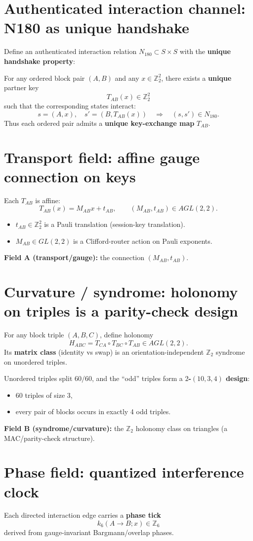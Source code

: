 \documentclass[11pt]{article}
\begin{document}
\section{Authenticated interaction channel: N180 as unique handshake}
Define an authenticated interaction relation $N_{180}\subset S\times S$ with the \textbf{unique handshake property}:

For any ordered block pair $(A,B)$ and any $x\in\mathbb{Z}_2^2$, there exists a \textbf{unique} partner key
\[
T_{AB}(x)\in\mathbb{Z}_2^2
\]
such that the corresponding states interact:
\[
s=(A,x),\quad s'=(B,T_{AB}(x))\quad\Rightarrow\quad (s,s')\in N_{180}.
\]
Thus each ordered pair admits a \textbf{unique key-exchange map} $T_{AB}$.

\section{Transport field: affine gauge connection on keys}
Each $T_{AB}$ is affine:
\[
T_{AB}(x)=M_{AB}x+t_{AB},\qquad (M_{AB},t_{AB})\in AGL(2,2).
\]
\begin{itemize}
  \item $t_{AB}\in\mathbb{Z}_2^2$ is a Pauli translation (session-key translation).
  \item $M_{AB}\in GL(2,2)$ is a Clifford-router action on Pauli exponents.
\end{itemize}
\noindent\textbf{Field A (transport/gauge):} the connection $(M_{AB},t_{AB})$.

\section{Curvature / syndrome: holonomy on triples is a parity-check design}
For any block triple $(A,B,C)$, define holonomy
\[
H_{ABC}=T_{CA}\circ T_{BC}\circ T_{AB}\in AGL(2,2).
\]
Its \textbf{matrix class} (identity vs swap) is an orientation-independent $\mathbb{Z}_2$ syndrome on unordered triples.

Unordered triples split $60/60$, and the “odd” triples form a \textbf{$2$-$(10,3,4)$ design}:
\begin{itemize}
  \item 60 triples of size 3,
  \item every pair of blocks occurs in exactly 4 odd triples.
\end{itemize}
\noindent\textbf{Field B (syndrome/curvature):} the $\mathbb{Z}_2$ holonomy class on triangles (a MAC/parity-check structure).

\section{Phase field: quantized interference clock}
Each directed interaction edge carries a \textbf{phase tick}
\[
k_6(A\to B;x)\in \mathbb{Z}_6
\]
derived from gauge-invariant Bargmann/overlap phases.
\end{document}
